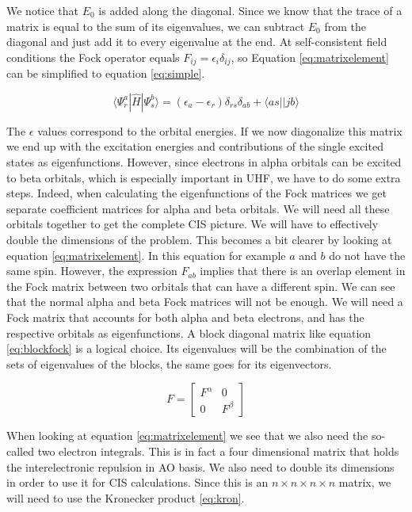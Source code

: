 \documentclass[twoside,twocolumn,9pt]{article}
\begin{document}
We notice that $E_0$ is added along the diagonal. Since we know that the trace of a matrix is equal to the sum of its eigenvalues, we can subtract $E_0$ from the diagonal and just
add it to every eigenvalue at the end. At self-consistent field conditions the Fock operator equals $F_{ij} = \epsilon_i\delta_{ij}$, so Equation \eqref{eq:matrixelement} can be
simplified to equation \eqref{eq:simple}.

\begin{equation}\label{eq:simple}
  \langle \Psi_r^a|\hat{H}|\Psi_s^b \rangle = (\epsilon_a - \epsilon_r)\delta_{rs}\delta_{ab} + \langle as || jb \rangle
\end{equation}

The $\epsilon$ values correspond to the orbital energies. If we now diagonalize this matrix we end up with the excitation energies and contributions of the single excited states as
eigenfunctions. However, since electrons in alpha orbitals can be excited to beta orbitals, which is especially important in UHF, we have to do some extra steps. Indeed, when
calculating the eigenfunctions of the Fock matrices we get separate coefficient matrices for alpha and beta orbitals. We will need all these orbitals together to get the complete
CIS picture. We will have to effectively double the dimensions of the problem. This becomes a bit clearer by looking at equation \eqref{eq:matrixelement}. In this equation for example
$a$ and $b$ do not have the same spin. However, the expression $F_{ab}$ implies that there is an overlap element in the Fock matrix between two orbitals that can have a different spin.
We can see that the normal alpha and beta Fock matrices will not be enough. We will need a Fock matrix that accounts for both alpha and beta electrons, and has the respective orbitals
as eigenfunctions. A block diagonal matrix like equation \eqref{eq:blockfock} is a logical choice. Its eigenvalues will be the combination of the sets of eigenvalues of the blocks, 
the same goes for its eigenvectors.

\begin{equation}\label{eq:blockfock}
  F = \begin{bmatrix}
    F^\alpha & 0 \\
    0 & F^\beta
  \end{bmatrix}
\end{equation} 

When looking at equation \eqref{eq:matrixelement} we see that we also need the so-called two electron integrals. This is in fact a four dimensional matrix that holds the 
interelectronic repulsion in AO basis. We also need to double its dimensions in order to use it for CIS calculations. Since this is an $n\times n\times n \times n$ 
matrix, we will need to use the Kronecker product \eqref{eq:kron}.
\end{document}
